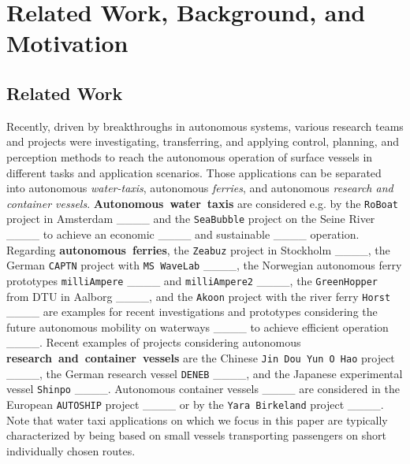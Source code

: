 \section{Related Work, Background, and Motivation}
\label{sec_background}
\subsection{Related Work}
Recently, driven by breakthroughs in autonomous systems, various research teams and projects were investigating, transferring, and applying control, planning, and perception methods to reach the autonomous operation of surface vessels in different tasks and application scenarios. Those applications can be separated into autonomous \textit{water-taxis},  \mbox{autonomous} \textit{ferries}, and autonomous \textit{research and container vessels}.  \mbox{\textbf{Autonomous water taxis}} are considered e.g. by the \texttt{RoBoat} project in Amsterdam ____ and the \texttt{SeaBubble} project on the Seine River ____ to achieve an economic ____ and sustainable ____ operation. 
Regarding  \mbox{\textbf{autonomous ferries}}, the \texttt{Zeabuz} project in Stockholm ____, the German \texttt{CAPTN} project with \texttt{MS WaveLab} ____, the Norwegian autonomous ferry prototypes \texttt{milliAmpere} ____ and \texttt{milliAmpere2} ____, the \texttt{GreenHopper} from DTU in Aalborg ____, and the \texttt{Akoon} project with the river ferry \texttt{Horst} ____ are examples for recent investigations and prototypes considering the future autonomous mobility on waterways ____ to achieve efficient operation ____. 
Recent examples of projects considering autonomous  \mbox{\textbf{research and container vessels}} are the Chinese \texttt{Jin Dou Yun O Hao} project ____, the German research vessel \texttt{DENEB} ____, and the Japanese experimental vessel \texttt{Shinpo} ____. Autonomous container vessels ____ are considered in the European \texttt{AUTOSHIP} project ____ or by the \texttt{Yara Birkeland} project ____. 
Note that water taxi applications on which we focus in this paper are typically characterized by being based on small vessels transporting passengers on short individually chosen routes.  


